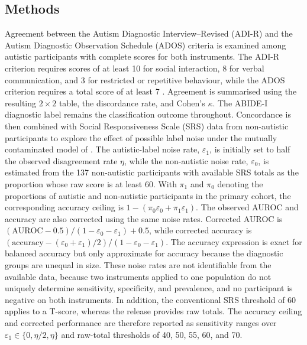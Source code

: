 \documentclass[11pt,a4paper]{article}
\begin{document}
\subsection{Methods}
Agreement between the Autism Diagnostic Interview--Revised (ADI-R) and the Autism Diagnostic Observation Schedule (ADOS) criteria is examined among autistic participants with complete scores for both instruments. The ADI-R criterion requires scores of at least 10 for social interaction, 8 for verbal communication, and 3 for restricted or repetitive behaviour, while the ADOS criterion requires a total score of at least 7 \citep{Lordetal1994}. Agreement is summarised using the resulting $2\times2$ table, the discordance rate, and Cohen's $\kappa$. The ABIDE-I diagnostic label remains the classification outcome throughout. Concordance is then combined with Social Responsiveness Scale (SRS) data from non-autistic participants to explore the effect of possible label noise under the mutually contaminated model of \citet{Menonetal2015}. The autistic-label noise rate, $\varepsilon_1$, is initially set to half the observed disagreement rate $\eta$, while the non-autistic noise rate, $\varepsilon_0$, is estimated from the 137 non-autistic participants with available SRS totals as the proportion whose raw score is at least 60. With $\pi_1$ and $\pi_0$ denoting the proportions of autistic and non-autistic participants in the primary cohort, the corresponding accuracy ceiling is $1-(\pi_0\varepsilon_0+\pi_1\varepsilon_1)$. The observed AUROC and accuracy are also corrected using the same noise rates. Corrected AUROC is $(\mathrm{AUROC}-0.5)/(1-\varepsilon_0-\varepsilon_1)+0.5$, while corrected accuracy is $(\mathrm{accuracy}-(\varepsilon_0+\varepsilon_1)/2)/(1-\varepsilon_0-\varepsilon_1)$. The accuracy expression is exact for balanced accuracy but only approximate for accuracy because the diagnostic groups are unequal in size. These noise rates are not identifiable from the available data, because two instruments applied to one population do not uniquely determine sensitivity, specificity, and prevalence, and no participant is negative on both instruments. In addition, the conventional SRS threshold of 60 applies to a T-score, whereas the release provides raw totals. The accuracy ceiling and corrected performance are therefore reported as sensitivity ranges over $\varepsilon_1\in\{0,\eta/2,\eta\}$ and raw-total thresholds of 40, 50, 55, 60, and 70.
\end{document}
